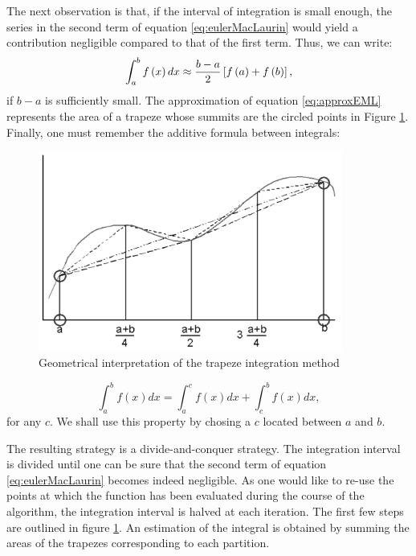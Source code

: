 The next observation is that, if the interval of integration is small enough, the series in the second term of equation \ref{eq:eulerMacLaurin} would yield a contribution negligible compared to that of the first term.
Thus, we can write:
\begin{equation}
\label{eq:approxEML}
  \int_a^b f\left(x\right)dx\approx{b-a\over
  2}\left[f\left(a\right)+f\left(b\right)\right],
\end{equation}
if $b-a$ is sufficiently small. The approximation of equation
\ref{eq:approxEML} represents the area of a trapeze whose summits
are the circled points in Figure \ref{fig:trapeze}. Finally, one
must remember the additive formula between integrals:
\begin{figure}
\centering\includegraphics[width=10cm]{Figures/IntegrationGraph}
\caption{Geometrical interpretation of the trapeze integration
method}\label{fig:trapeze}
\end{figure}
\begin{equation}
\label{eq:addintegral}
  \int_a^b f\left(x\right)dx=\int_a^c f\left(x\right)dx+\int_c^b f\left(x\right)dx,
\end{equation}
for any $c$. We shall use this property by chosing a $c$ located
between $a$ and $b$.

The resulting strategy is a divide-and-conquer strategy. The
integration interval is divided until one can be sure that the
second term of equation \ref{eq:eulerMacLaurin} becomes indeed
negligible. As one would like to re-use the points at which the
function has been evaluated during the course of the algorithm,
the integration interval is halved at each iteration. The first
few steps are outlined in figure \ref{fig:trapeze}. An estimation
of the integral is obtained by summing the areas of the trapezes
corresponding to each partition.

